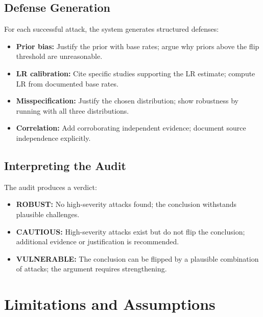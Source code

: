 \documentclass[11pt,a4paper]{article}
\begin{document}
\subsection{Defense Generation}

For each successful attack, the system generates structured defenses:
\begin{itemize}
\item \textbf{Prior bias:} Justify the prior with base rates; argue why priors
  above the flip threshold are unreasonable.
\item \textbf{LR calibration:} Cite specific studies supporting the LR estimate;
  compute LR from documented base rates.
\item \textbf{Misspecification:} Justify the chosen distribution; show
  robustness by running with all three distributions.
\item \textbf{Correlation:} Add corroborating independent evidence; document
  source independence explicitly.
\end{itemize}

\subsection{Interpreting the Audit}

The audit produces a verdict:
\begin{itemize}
\item \textbf{ROBUST:} No high-severity attacks found; the conclusion
  withstands plausible challenges.
\item \textbf{CAUTIOUS:} High-severity attacks exist but do not flip the
  conclusion; additional evidence or justification is recommended.
\item \textbf{VULNERABLE:} The conclusion can be flipped by a plausible
  combination of attacks; the argument requires strengthening.
\end{itemize}

\label{sec:adversarial}

\section{Limitations and Assumptions}
\end{document}
